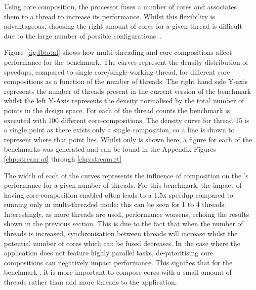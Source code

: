 Using core composition, the processor fuses a number of cores and associates them to a thread to increase its performance.
Whilst this flexibility is advantageous, choosing the right amount of cores for a given thread is difficult due to the large number of possible configurations~\cite{gulati2008multitaskingdmc}.

Figure~\ref{fig:fbtotal} shows how multi-threading and core compositions affect performance for the  benchmark.
The curves represent the density distribution of speedups, compared to single core/single-working-thread, for different core compositions as a function of the number of threads.
The right hand side Y-axis represents the number of threads present in the current version of the benchmark whilst the left Y-Axis represents the density normalised by the total number of points in the design space.
For each of the thread counts the benchmark is executed with 100 different core-compositions.
The density curve for thread 15 is a single point as there exists only a single composition, so a line is drawn to represent where that point lies.
Whilst only  is shown here, a figure for each of the benchmarks was generated and can be found in the Appendix Figures \ref{chp:stream:at} through \ref{chp:stream:rt}

The width of each of the curves represents the influence of composition on the 's performance for a given number of threads.
For this benchmark, the impact of having core-composition enabled often leads to a 1.5x speedup compared to running only in multi-threaded mode; this can be seen for 1 to 4 threads.
Interestingly, as more threads are used, performance worsens, echoing the results shown in the previous section.
This is due to the fact that when the number of threads is increased, synchronisation between threads will increase whilst the potential number of cores which can be fused decreases.
In the case where the application does not feature highly parallel tasks, de-prioritising core compositions can negatively impact performance.
This signifies that for the benchmark , it is more important to compose cores with a small amount of threads rather than add more threads to the application.



